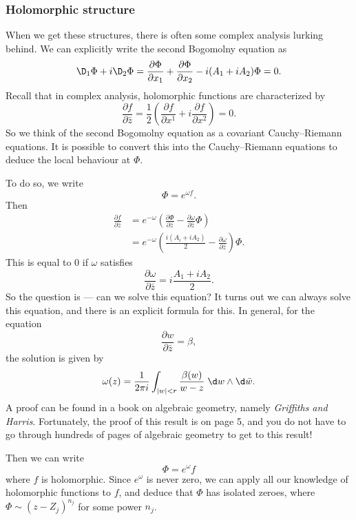\documentclass[a4paper]{article}
\begin{document}
\subsubsection*{Holomorphic structure}
When we get these structures, there is often some complex analysis lurking behind. We can explicitly write the second Bogomolny equation as
\[
  \D_1 \Phi + i \D_2 \Phi = \frac{\partial \Phi}{\partial x_1} + \frac{\partial \Phi}{\partial x_2} - i(A_1 + i A_2) \Phi = 0.
\]
Recall that in complex analysis, holomorphic functions are characterized by
\[
  \frac{\partial f}{\partial \bar{z}} = \frac{1}{2} \left(\frac{\partial f}{\partial x^1} + i \frac{\partial f}{\partial x^2}\right) = 0.
\]
So we think of the second Bogomolny equation as a covariant Cauchy--Riemann equations. It is possible to convert this into the Cauchy--Riemann equations to deduce the local behaviour at $\Phi$.

To do so, we write
\[
  \Phi = e^{\omega f}.
\]
Then
\begin{align*}
  \frac{\partial f}{\partial \bar{z}} &= e^{-\omega} \left(\frac{\partial \Phi}{\partial \bar{z}} - \frac{\partial \omega}{\partial \bar{z}} \Phi\right)\\
  &= e^{-\omega} \left(\frac{i(A_i + i A_2)}{2} - \frac{\partial \omega}{\partial \bar{z}}\right)\Phi.
\end{align*}
This is equal to $0$ if $\omega$ satisfies
\[
  \frac{\partial \omega}{\partial \bar{z}} = i \frac{A_1 + iA_2}{2}.
\]
So the question is --- can we solve this equation? It turns out we can always solve this equation, and there is an explicit formula for this. In general, for the equation
\[
  \frac{\partial w}{\partial \bar{z}} = \beta,
\]
the solution is given by
\[
  \omega(z) = \frac{1}{2\pi i} \int_{|w| < r} \frac{\beta(w)}{w - z}\;\d w \wedge \d \bar{w}.
\]
A proof can be found in a book on algebraic geometry, namely \emph{Griffiths and Harris}. Fortunately, the proof of this result is on page 5, and you do not have to go through hundreds of pages of algebraic geometry to get to this result!

Then we can write
\[
  \Phi = e^{\omega} f
\]
where $f$ is holomorphic. Since $e^{\omega}$ is never zero, we can apply all our knowledge of holomorphic functions to $f$, and deduce that $\Phi$ has isolated zeroes, where $\Phi \sim (z - Z_j)^{n_j}$ for some power $n_j$.
\end{document}
